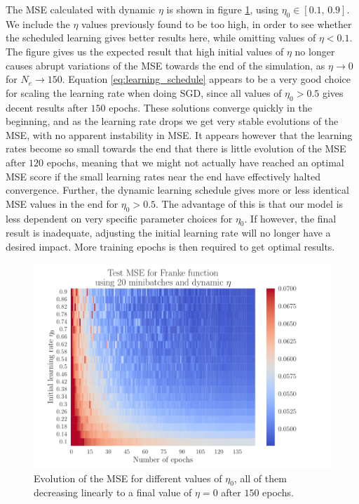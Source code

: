 \documentclass[12pt]{extarticle}
\begin{document}
The MSE calculated with dynamic $\eta$ is shown in figure \ref{fig:SGD_Franke_epochs_dynamic_eta}, using $\eta_0\in[0.1,\,0.9]$. We include the $\eta$ values previously found to be too high, in order to see whether the scheduled learning gives better results here, while omitting values of $\eta<0.1$. The figure gives us the expected result that high initial values of $\eta$ no longer causes abrupt variations of the MSE towards the end of the simulation, as $\eta\to0$ for $N_e\to150$. Equation \eqref{eq:learning_schedule} appears to be a very good choice for scaling the learning rate when doing SGD, since all values of $\eta_0>0.5$ gives decent results after $150$ epochs. These solutions converge quickly in the beginning, and as the learning rate drops we get very stable evolutions of the MSE, with no apparent instability in MSE. It appears however that the learning rates become so small towards the end that there is little evolution of the MSE after $120$ epochs, meaning that we might not actually have reached an optimal MSE score if the small learning rates near the end have effectively halted convergence. Further, the dynamic learning schedule gives more or less identical MSE values in the end for $\eta_0>0.5$. The advantage of this is that our model is less dependent on very specific parameter choices for $\eta_0$. If however, the final result is inadequate, adjusting the initial learning rate will no longer have a desired impact. More training epochs is then required to get optimal results.

\begin{figure}[h!]
	\includegraphics[width=0.9\linewidth]{SGD_Franke/reg_Franke__epochs_dynamic_eta__Test_MSE__792536.pdf}
	\caption{Evolution of the MSE for different values of $\eta_0$, all of them decreasing linearly to a final value of $\eta=0$ after $150$ epochs.}
	\label{fig:SGD_Franke_epochs_dynamic_eta}
\end{figure}
\end{document}

